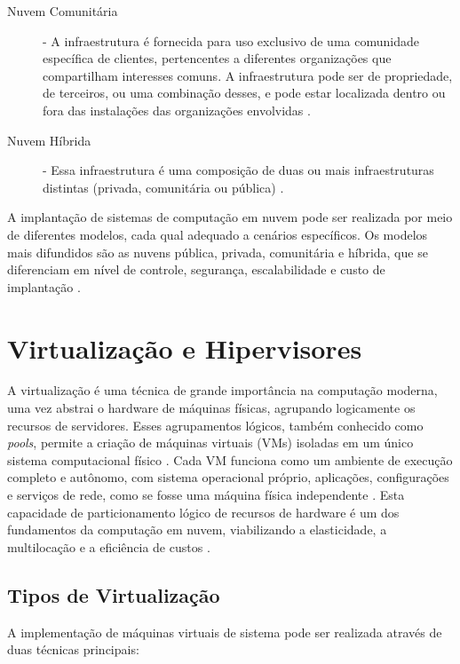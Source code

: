 \begin{description}
    \item[Nuvem Comunitária] - A infraestrutura é fornecida para uso exclusivo de uma comunidade específica de clientes, pertencentes a diferentes organizações que compartilham interesses comuns. A infraestrutura pode ser de propriedade, de terceiros, ou uma combinação desses, e pode estar localizada dentro ou fora das instalações das organizações envolvidas \cite{mell2011}.
    \item[Nuvem Híbrida] - Essa infraestrutura é uma composição de duas ou mais infraestruturas distintas (privada, comunitária ou pública)  \cite{mell2011}.
\end{description}

A implantação de sistemas de computação em nuvem pode ser realizada por meio de diferentes modelos, cada qual adequado a cenários específicos. Os modelos mais difundidos são as nuvens pública, privada, comunitária e híbrida, que se diferenciam em nível de controle, segurança, escalabilidade e custo de implantação \cite{mell2011}.

\section{Virtualização e Hipervisores}
\label{sec:virtualizacao}

A virtualização é uma técnica de grande importância na computação moderna, uma vez  abstrai o hardware de máquinas físicas, agrupando logicamente os recursos de servidores. Esses agrupamentos lógicos, também conhecido como \textit{pools}, permite a criação de máquinas virtuais (VMs) isoladas em um único sistema computacional físico \cite{carissimi2008, kominos2017}. Cada VM funciona como um ambiente de execução completo e autônomo, com sistema operacional próprio, aplicações, configurações e  serviços de rede, como se fosse uma máquina física independente \cite{carissimi2008}. Esta capacidade de particionamento lógico de recursos de hardware é um dos fundamentos da computação em nuvem, viabilizando a elasticidade, a multilocação e a eficiência de custos \cite{chawla2025}.

\subsection{Tipos de Virtualização}
A implementação de máquinas virtuais de sistema pode ser realizada através de duas técnicas principais:

